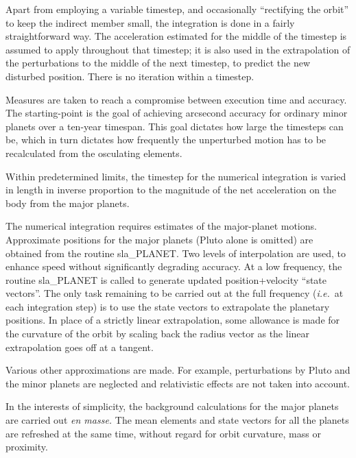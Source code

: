 \documentclass[11pt,twoside,nolof]{starlink}
\begin{document}
{\begin{enumerate}
        Apart from employing a variable timestep, and occasionally
        ``rectifying the orbit'' to keep the indirect member small, the
        integration is done in a fairly straightforward way.  The
        acceleration estimated for the middle of the timestep is assumed
        to apply throughout that timestep;  it is also used in the
        extrapolation of the perturbations to the middle of the next
        timestep, to predict the new disturbed position.  There is no
        iteration within a timestep.

        Measures are taken to reach a compromise between execution time
        and accuracy.  The starting-point is the goal of achieving
        arcsecond accuracy for ordinary minor planets over a ten-year
        timespan.  This goal dictates how large the timesteps can be,
        which in turn dictates how frequently the unperturbed motion has
        to be recalculated from the osculating elements.

        Within predetermined limits, the timestep for the numerical
        integration is varied in length in inverse proportion to the
        magnitude of the net acceleration on the body from the major
        planets.

        The numerical integration requires estimates of the major-planet
        motions.  Approximate positions for the major planets (Pluto
        alone is omitted) are obtained from the routine sla\_PLANET.  Two
        levels of interpolation are used, to enhance speed without
        significantly degrading accuracy.  At a low frequency, the routine
        sla\_PLANET is called to generate updated position+velocity ``state
        vectors''.  The only task remaining to be carried out at the full
        frequency (\textit{i.e.}\ at each integration step) is to use the state
        vectors to extrapolate the planetary positions.  In place of a
        strictly linear extrapolation, some allowance is made for the
        curvature of the orbit by scaling back the radius vector as the
        linear extrapolation goes off at a tangent.

        Various other approximations are made.  For example, perturbations
        by Pluto and the minor planets are neglected and relativistic
        effects are not taken into account.

        In the interests of simplicity, the background calculations for
        the major planets are carried out \textit{en masse.}
        The mean elements and
        state vectors for all the planets are refreshed at the same time,
        without regard for orbit curvature, mass or proximity.


\end{enumerate}}
\end{document}

